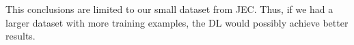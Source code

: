 This conclusions are limited to our small dataset from \gls{JEC}. Thus, if we had a larger dataset with more training examples, the \gls{DL} would possibly achieve better results.









